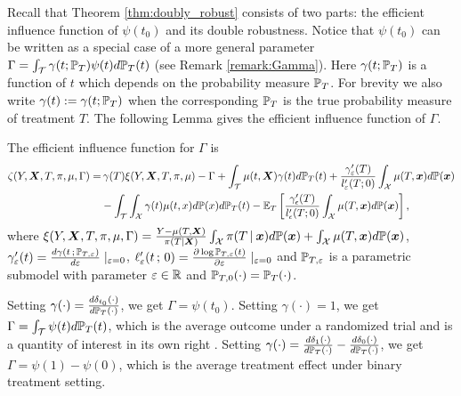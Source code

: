 Recall that Theorem \ref{thm:doubly_robust} consists of two parts: the efficient influence function of $\psi(t_0)$ and its double robustness. Notice that $\psi(t_0)$ can be written as a special case of a more general parameter $\Gamma=\int_{\mathcal{T}}\gamma(t;\P_T)\psi(t)d\P_T(t)$ (see Remark \ref{remark:Gamma}). Here $\gamma(t;\P_T)$ is a function of $t$ which depends on the probability measure $\P_T$. For brevity we also write $\gamma(t):=\gamma(t;\P_T)$ when the corresponding $\P_T$ is the true probability measure of treatment $T$. The following Lemma gives the efficient influence function of $\Gamma$.
\begin{lemma}\label{thm:EIF}
The efficient influence function for $\Gamma$ is
\begin{equation*} 
\begin{split}
    \zeta(Y,\X,T,\pi,\mu,\Gamma)=&\,\gamma(T)\xi(Y,\X,T,\pi,\mu)-\Gamma+\int_{\mathcal{\mathcal{T}}}\mu(t,\X)\text{\ensuremath{\gamma(t)}}d\P_T(t)+\frac{\gamma'_{\varepsilon}(T)}{l'_{\varepsilon}(T;0)}\int_{\mathcal{X}}\mu(T,\x)d\P(\x)
    \\&-\int_{\mathcal{T}}\int_{\mathcal{X}}\gamma(t)\mu(t,x)d\P(x)d\P_T(t)-\E_T\left[\frac{\gamma'_{\epsilon}(T)}{l'_{\epsilon}(T;0)}\int_{\mathcal{X}}\mu(T,\x)d\P(\x)\right],
\end{split}
\end{equation*}
where $\xi(Y,\X,T,\pi,\mu,\Gamma)=\frac{Y-\mu(T,\X)}{\pi(T\mid\X)}\int_{\mathcal{X}}\pi(T\C\x)d\P(\x)+\int_{\mathcal{X}}\mu(T,\x)d\P(\x)$, $\gamma_{\varepsilon}'(t)=\frac{d\gamma(t\,;\,\P_{T,\varepsilon})}{d\varepsilon}\mid_{\varepsilon=0}$, $\ell_{\varepsilon}'(t\,;\,0)=\frac{\partial\log \P_{T,\varepsilon}(t)}{\partial\varepsilon}\mid_{\varepsilon=0}$ and $\P_{T,\varepsilon}$ is a parametric submodel with parameter $\varepsilon\in\R$ and $\P_{T,0}(\cdot)=\P_T(\cdot)$.
\end{lemma}

\begin{remark}\label{remark:Gamma}
Setting $\gamma(\cdot)=\frac{d\delta_{t_0}(\cdot)}{d\P_T(\cdot)}$, we get $\Gamma=\psi(t_0)$.
Setting $\gamma(\cdot)=1$, we get $\Gamma=\int_{\mathcal{T}}\psi(t)d\P_T(t)$, which is the average outcome under a randomized trial and is a quantity of interest in its own right \citep{kennedy2017non}. Setting $\gamma(\cdot)=\frac{d\delta_{1}(\cdot)}{d\P_T(\cdot)}-\frac{d\delta_{0}(\cdot)}{d\P_T(\cdot)}$, we get $\Gamma=\psi(1)-\psi(0)$, which is the average treatment effect under binary treatment setting. 
\end{remark}

